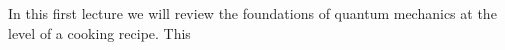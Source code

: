 In this first lecture we will review the foundations of quantum mechanics at the level of a cooking recipe. This 